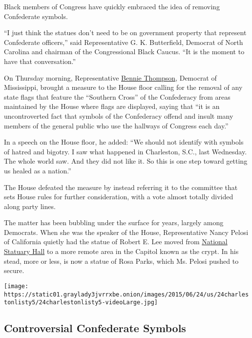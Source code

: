 Black members of Congress have quickly embraced the idea of removing
Confederate symbols.

``I just think the statues don't need to be on government property that
represent Confederate officers,'' said Representative G. K. Butterfield,
Democrat of North Carolina and chairman of the Congressional Black
Caucus. ``It is the moment to have that conversation.''

On Thursday morning, Representative
\href{http://www.rollcall.com/members/280.html}{Bennie Thompson},
Democrat of Mississippi, brought a measure to the House floor calling
for the removal of any state flags that feature the ``Southern Cross''
of the Confederacy from areas maintained by the House where flags are
displayed, saying that ``it is an uncontroverted fact that symbols of
the Confederacy offend and insult many members of the general public who
use the hallways of Congress each day.''

In a speech on the House floor, he added: ``We should not identify with
symbols of hatred and bigotry. I saw what happened in Charleston, S.C.,
last Wednesday. The whole world saw. And they did not like it. So this
is one step toward getting us healed as a nation.''

The House defeated the measure by instead referring it to the committee
that sets House rules for further consideration, with a vote almost
totally divided along party lines.

The matter has been bubbling under the surface for years, largely among
Democrats. When she was the speaker of the House, Representative Nancy
Pelosi of California quietly had the statue of Robert E. Lee moved from
\href{http://www.aoc.gov/capitol-buildings/national-statuary-hall}{National
Statuary Hall} to a more remote area in the Capitol known as the crypt.
In his stead, more or less, is now a statue of Rosa Parks, which Ms.
Pelosi pushed to secure.

\href{https://www.nytimes3xbfgragh.onion/interactive/2015/06/23/us/Calls-to-Cut-Ties-to-Symbols-of-the-South.html}{}

\texttt{[image: https://static01.graylady3jvrrxbe.onion/images/2015/06/24/us/24charlestonlisty5/24charlestonlisty5-videoLarge.jpg]}

\hypertarget{controversial-confederate-symbols}{%
\subsection{Controversial Confederate
Symbols}\label{controversial-confederate-symbols}}

